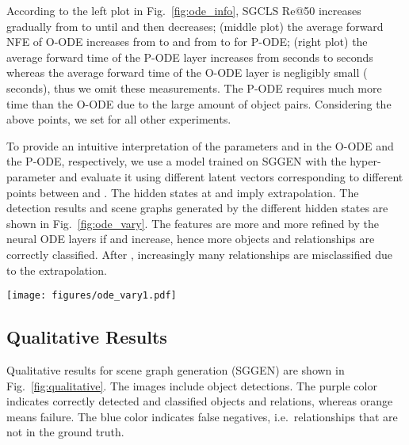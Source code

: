 \documentclass[runningheads]{llncs}
\begin{document}
According to the left plot in Fig.~\ref{fig:ode_info}, SGCLS Re@50 increases gradually from  to  until  and then decreases; (middle plot) the average forward NFE of O-ODE increases from  to  and from  to  for P-ODE; (right plot) the average forward time of the P-ODE layer increases from  seconds to  seconds whereas the average forward time of the O-ODE layer is negligibly small ( seconds), thus we omit these measurements. The P-ODE requires much more time than the O-ODE due to the large amount of object pairs. Considering the above points, we set  for all other experiments.


To provide an intuitive interpretation of the parameters  and  in the O-ODE and the P-ODE, respectively, we use a model trained on SGGEN with the hyper-parameter  and evaluate it using different latent vectors corresponding to different points between  and . 
The hidden states at  and  imply extrapolation. The detection results and scene graphs generated by the different hidden states are shown in Fig.~\ref{fig:ode_vary}. The features are more and more refined by the neural ODE layers if  and  increase, hence more objects and relationships are correctly classified. After , increasingly many relationships are misclassified due to the extrapolation.

\begin{figure*}[!ht]
    \centering
    \texttt{[image: figures/ode\_vary1.pdf]}
    \caption{We evaluate the model trained with the hyper-parameter , i.e.~during training the hidden vector at  is used for classifications. The upper row visualizes detection results while the lower row shows the corresponding scene graphs. The red box indicates the state corresponding to . \newline
    The orange boxes and edges indicate the objects and predicates in the ground truth that are not detected, purple that the objects and predicates are predicted correctly. Blue edges show false positives.}
\label{fig:ode_vary}
\end{figure*}


\subsection{Qualitative Results}
\label{subsec:qualitative}

Qualitative results for scene graph generation (SGGEN) are shown in Fig.~\ref{fig:qualitative}. The images include object detections. The purple color indicates correctly detected and classified objects and relations, whereas orange means failure. The blue color indicates false negatives, i.e.~relationships that are not in the ground truth. 
\end{document}
